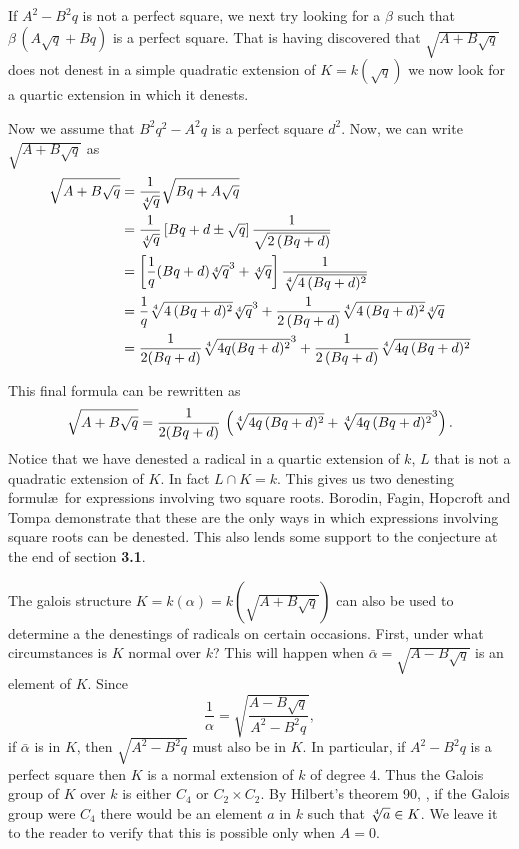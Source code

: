 If $A^2 - B^2 q$ is not a perfect square, we next try looking for a
$\beta$ such that $\beta\,(A \sqrt{q} + B q)$ is a perfect square.  That
is having discovered that $\sqrt{A + B \sqrt{q}}$ does not denest in a
simple quadratic extension of $K = k(\sqrt{q})$ we now look for a
quartic extension in which it denests.

Now we assume that $B^2 q^2 - A^2 q$ is a perfect square $d^2$.  Now, we
can write $\sqrt{A + B \sqrt{q}}$ as
\[
\begin{aligned}
\sqrt{A + B \sqrt{q}} & 
= \frac{1}{\root 4 \of q} \sqrt{B q + A \sqrt{q}}\\
&= \frac{1}{\root 4 \of q} \left[ Bq + d \pm \sqrt{q} \right]
\frac{1}{\sqrt{2\,(B q + d)}}\\
&=\left[\frac{1}{q} (B q + d) {\root 4 \of q}^3 + {\root 4 \of q}\right]
\frac{1}{\root 4 \of{4\,(B q + d)^2}}\\
&=\frac{1}{q} {\root 4\of{4\,(Bq +d)^2}} {\root 4\of q}^3
+ \frac{1}{2\,(Bq+d)} {\root 4\of{4\,(Bq+d)^2}} {\root 4\of q}\\
&= \frac{1}{ 2 (Bq +d)} {\root 4 \of{4 q(Bq+d)^2}}^3 +
\frac{1}{2\,(Bq+d)} \root 4\of{4 q\,(Bq+d)^2}
\end{aligned}
\]

This final formula can be rewritten as 
\[
\sqrt{A + B \sqrt{q}} = 
 \frac{1}{2 (Bq + d)} \,\left( \root 4\of{4q\,(Bq+d)^2} + 
{\root 4\of{4q\,(Bq+d)^2}}^3 \right).
\]
Notice that we have denested a radical in a quartic extension of $k$,
$L$ that is not a quadratic extension of $K$.  In fact $L \cap K = k$.
This gives us two denesting formul\ae\ for expressions involving two
square roots.  Borodin, Fagin, Hopcroft and Tompa
\cite{Borodin:Radicals} demonstrate that these are the only ways in
which expressions involving square roots can be denested.  This also
lends some support to the conjecture at the end of section {\bf 3.1}.

\medskip
The galois structure $K = k(\alpha) = k(\sqrt{A+B \sqrt{q}})$ can also
be used to determine a the denestings of radicals on certain occasions.
First, under what circumstances is $K$ normal over $k$?  This will
happen when $\bar \alpha = \sqrt{A - B\sqrt{q}}$ is an element of $K$.
Since 
\[
\frac{1}{\alpha} = \sqrt{\frac{A - B \sqrt{q}}{A^2 - B^2 q}},
\]
if $\bar \alpha$ is in $K$, then $\sqrt{A^2-B^2 q}$ must also be in $K$.
In particular, if $A^2 - B^2 q$ is a perfect square then $K$ is a normal
extension of $k$ of degree 4.  Thus the Galois group of $K$ over $k$ is
either $C_4$ or $C_2 \times C_2$.  By Hilbert's theorem 90,
, if the Galois group were $C_4$ there
would be an element $a$ in $k$ such that $\root 4\of a \in K$.  We
leave it to the reader to verify that this is possible only when $A = 0$.

